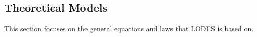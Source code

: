 \documentclass[12pt]{article}
\newcounter{assumpnum} %
\newcommand{\progname}{LODES} %
\begin{document}






  


\subsection{Theoretical Models}\label{sec_theoretical}

This section focuses on the general equations and laws that \progname{} is based
on.

~\newline
\end{document}
